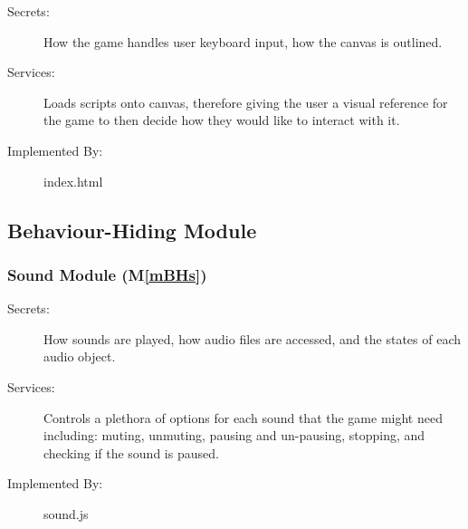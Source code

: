 \documentclass[12pt, titlepage]{article}
\newcommand{\mref}[1]{M\ref{#1}}
\begin{document}

\begin{description}
\item[Secrets:]How the game handles user keyboard input, how the canvas is outlined.
\item[Services:] Loads scripts onto canvas, therefore giving the user a visual reference for the game to then decide how they would like to interact with it.
\item[Implemented By:] index.html
\end{description}

\subsection{Behaviour-Hiding Module}


\subsubsection{Sound Module (\mref{mBHs})}
\begin{description}
\item[Secrets:] How sounds are played, how audio files are accessed, and the states of each audio object.
\item[Services:] Controls a plethora of options for each sound that the game might need including: muting, unmuting, pausing and un-pausing, stopping, and checking if the sound is paused.
\item[Implemented By:] sound.js
\end{description}
\end{document}
